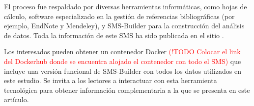 El proceso fue respaldado por diversas herramientas informáticas, como hojas de cálculo, software especializado en la gestión de referencias bibliográficas (por ejemplo, EndNote y Mendeley), y SMS-Builder \cite{sms-builder-repo} para la construcción del análisis de datos. Toda la información de este SMS ha sido publicada en el sitio \cite{sms-builder-own-container}.

Los interesados pueden obtener un contenedor Docker \textcolor{red}{(!TODO Colocar el link del Dockerhub donde se encuentra alojado el contenedor con todo el SMS)} que incluye una versión funcional de SMS-Builder con todos los datos utilizados en este estudio. Se invita a los lectores a interactuar con esta herramienta tecnológica para obtener información complementaria a la que se presenta en este artículo.
